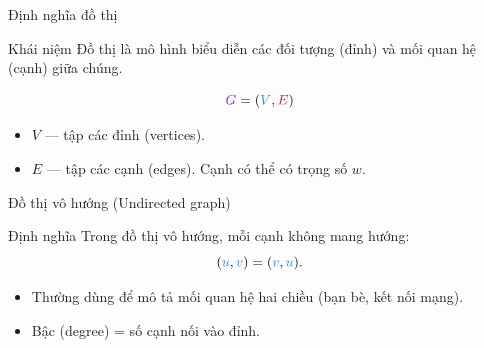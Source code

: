 \documentclass{beamer}
\title{\hlblue{Lý thuyết đồ thị}}
\author{Dương Khánh Kỳ}
\date{\hlcyan{06/03/2026}}
\newcommand{\hlblue}[1]{\textcolor{myblue}{#1}}
\newcommand{\hlgreen}[1]{\textcolor{mygreen}{#1}}
\newcommand{\hlred}[1]{\textcolor{myred}{#1}}
\newcommand{\hlpurple}[1]{\textcolor{mypurple}{#1}}
\newcommand{\hlorange}[1]{\textcolor{myorange}{#1}}
\newcommand{\hlcyan}[1]{\textcolor{mycyan}{#1}}
\begin{document}
\frame{\titlepage}

\begin{frame}{\hlorange{Định nghĩa đồ thị}}
\begin{block}{\hlgreen{Khái niệm}}
Đồ thị là mô hình biểu diễn các đối tượng (\hlblue{đỉnh}) và mối quan hệ (\hlred{cạnh}) giữa chúng.
\end{block}

\[
\hlpurple{G}=(\hlblue{V},\hlred{E})
\]

\medskip
\begin{itemize}
\item \hlblue{$V$} — tập các \hlblue{đỉnh} (vertices).
\item \hlred{$E$} — tập các \hlred{cạnh} (edges). Cạnh có thể có trọng số \hlorange{$w$}.
\end{itemize}
\end{frame}

\begin{frame}{\hlorange{Đồ thị vô hướng (Undirected graph)}}
\begin{block}{\hlgreen{Định nghĩa}}
Trong đồ thị \hlred{vô hướng}, mỗi cạnh không mang hướng:
\[
(\hlblue{u},\hlblue{v}) = (\hlblue{v},\hlblue{u}).
\]
\end{block}

\medskip
\begin{itemize}
\item Thường dùng để mô tả mối quan hệ hai chiều (bạn bè, kết nối mạng).
\item \hlcyan{Bậc (degree)} = số cạnh nối vào đỉnh.
\end{itemize}

\bigskip
\begin{center}
\end{center}
\end{frame}
\end{document}
